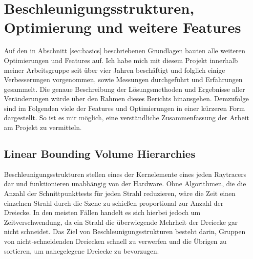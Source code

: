 \documentclass[crop=false]{standalone}
\begin{document}
  \section{Beschleunigungsstrukturen, Optimierung und weitere Features} %
  \label{sec:beschleunigungsstrukturen_optimierung_und_weitere_features}
    Auf den in Abschnitt \ref{sec:basics} beschriebenen Grundlagen bauten alle weiteren Optimierungen und Features auf.
    Ich habe mich mit diesem Projekt innerhalb meiner Arbeitsgruppe seit über vier Jahren beschäftigt und folglich einige Verbesserungen vorgenommen, sowie Messungen durchgeführt und Erfahrungen gesammelt.
    Die genaue Beschreibung der Lösungsmethoden und Ergebnisse aller Veränderungen würde über den Rahmen dieses Berichts hinausgehen.
    Demzufolge sind im Folgenden viele der Features und Optimierungen in einer kürzeren Form dargestellt.
    So ist es mir möglich, eine verständliche Zusammenfassung der Arbeit am Projekt zu vermitteln.

    \subsection{Linear Bounding Volume Hierarchies} %
    \label{sub:linear_bounding_volume_hierarchies}
      Beschleunigungsstrukturen stellen eines der Kernelemente eines jeden Raytracers dar und funktionieren unabhängig von der Hardware.
      Ohne Algorithmen, die die Anzahl der Schnittpunkttests für jeden Strahl reduzieren, wäre die Zeit einen einzelnen Strahl durch die Szene zu schießen proportional zur Anzahl der Dreiecke.
      In den meisten Fällen handelt es sich hierbei jedoch um Zeitverschwendung, da ein Strahl die überwiegende Mehrheit der Dreiecke gar nicht schneidet.
      Das Ziel von Beschleunigungsstrukturen besteht darin, Gruppen von nicht-schneidenden Dreiecken schnell zu verwerfen und die Übrigen zu sortieren, um nahegelegene Dreiecke zu bevorzugen.
\end{document}
